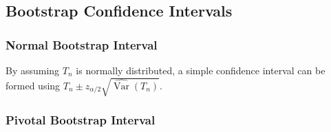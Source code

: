 \documentclass[11pt]{report} %
\begin{document}
\subsection{Bootstrap Confidence Intervals}

\subsubsection{Normal Bootstrap Interval}

By assuming $T_{n}$ is normally distributed, a simple confidence interval can be formed using $T_{n} \pm z_{\alpha/2}\sqrt{\hat{\operatorname{Var}}\left(T_{n}\right)}$.

\subsubsection{Pivotal Bootstrap Interval}
\end{document}

